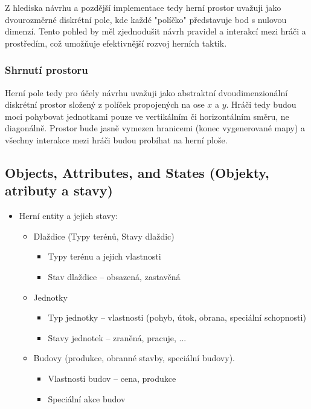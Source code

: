 Z hlediska návrhu a pozdější implementace tedy herní prostor uvažuji jako dvourozměrné diskrétní pole, kde každé "políčko" představuje bod s nulovou dimenzí. Tento pohled by měl zjednodušit návrh pravidel a interakcí mezi hráči a prostředím, což umožňuje efektivnější rozvoj herních taktik.

\subsubsection{Shrnutí prostoru}

Herní pole tedy pro účely návrhu uvažuji jako abstraktní dvoudimenzionální diskrétní prostor složený z políček propojených na ose $x$ a $y$. Hráči tedy budou moci pohybovat jednotkami pouze ve vertikálním či horizontálním směru, ne diagonálně. Prostor bude jasně vymezen hranicemi (konec vygenerované mapy) a všechny interakce mezi hráči budou probíhat na herní ploše. 

\subsection{Objects, Attributes, and States (Objekty, atributy a stavy)}
\begin{itemize}
    \item Herní entity a jejich stavy:
    \begin{itemize}
        \item Dlaždice (Typy terénů, Stavy dlaždic)
        \begin{itemize}
            \item Typy terénu a jejich vlastnosti
            \item Stav dlaždice -- obsazená, zastavěná
        \end{itemize}
        \item Jednotky
        \begin{itemize}
            \item Typ jednotky -- vlastnosti (pohyb, útok, obrana, speciální schopnosti)
            \item Stavy jednotek -- zraněná, pracuje, ...
        \end{itemize}
        \item Budovy (produkce, obranné stavby, speciální budovy).
        \begin{itemize}
            \item Vlastnosti budov -- cena, produkce
            \item Speciální akce budov
        \end{itemize}
    \end{itemize}
\end{itemize}

